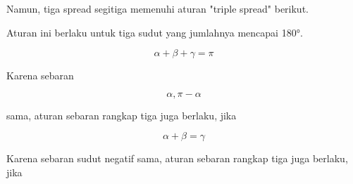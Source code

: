 \documentclass[a4paper,10pt]{article}
\begin{document}
\begin{eulernotebook}
\begin{eulercomment}
\begin{eulercomment}
\begin{eulercomment}
\begin{eulercomment}
\begin{eulercomment}
\begin{eulercomment}
\begin{eulercomment}
\begin{eulercomment}
\begin{eulercomment}
\begin{eulercomment}
\begin{eulercomment}
\begin{eulercomment}
\begin{eulercomment}
\begin{eulercomment}
\begin{eulercomment}
\begin{eulercomment}
\begin{eulercomment}
\begin{eulercomment}
\begin{eulercomment}
\begin{eulercomment}
\begin{eulercomment}
\begin{eulercomment}
\begin{eulercomment}
\begin{eulercomment}
\begin{eulercomment}
\begin{eulercomment}
\begin{eulercomment}
\begin{eulercomment}
\begin{eulercomment}
\begin{eulercomment}
\begin{eulercomment}
Namun, tiga spread segitiga memenuhi aturan "triple spread" berikut.
\end{eulercomment}
\begin{eulercomment}
Aturan ini berlaku untuk tiga sudut yang jumlahnya mencapai 180°.

\end{eulercomment}
\begin{eulerformula}
\[
\alpha+\beta+\gamma=\pi
\]
\end{eulerformula}
\begin{eulercomment}
Karena sebaran

\end{eulercomment}
\begin{eulerformula}
\[
\alpha, \pi-\alpha
\]
\end{eulerformula}
\begin{eulercomment}
sama, aturan sebaran rangkap tiga juga berlaku, jika

\end{eulercomment}
\begin{eulerformula}
\[
\alpha+\beta=\gamma
\]
\end{eulerformula}
\begin{eulercomment}
Karena sebaran sudut negatif sama, aturan sebaran rangkap tiga juga
berlaku, jika


\end{eulercomment}
\end{eulercomment}
\end{eulercomment}
\end{eulercomment}
\end{eulercomment}
\end{eulercomment}
\end{eulercomment}
\end{eulercomment}
\end{eulercomment}
\end{eulercomment}
\end{eulercomment}
\end{eulercomment}
\end{eulercomment}
\end{eulercomment}
\end{eulercomment}
\end{eulercomment}
\end{eulercomment}
\end{eulercomment}
\end{eulercomment}
\end{eulercomment}
\end{eulercomment}
\end{eulercomment}
\end{eulercomment}
\end{eulercomment}
\end{eulercomment}
\end{eulercomment}
\end{eulercomment}
\end{eulercomment}
\end{eulercomment}
\end{eulercomment}
\end{eulercomment}
\end{eulernotebook}
\end{document}
